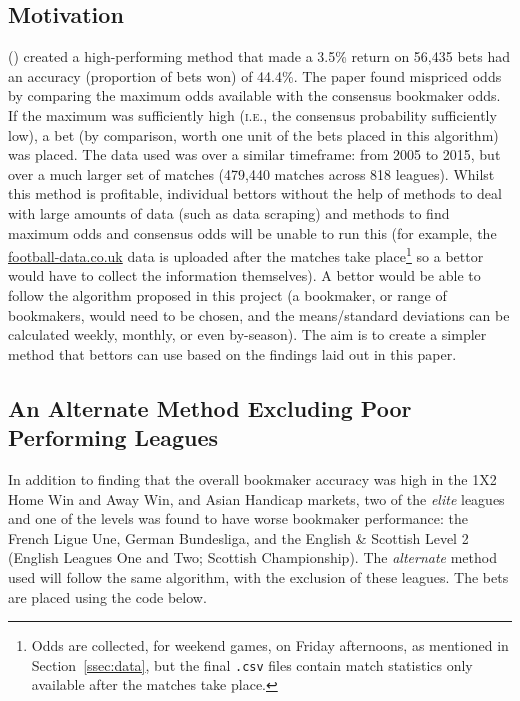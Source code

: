 \documentclass[a4paper,10pt]{report}
\begin{document}
\subsection{Motivation}\label{ssec:motivationofmethod}
\citeauthor{kaunitz17} (\citeyear{kaunitz17}) created a high-performing method that made a 3.5\% return on 56,435 bets had an accuracy (proportion of bets won) of 44.4\%. The paper found mispriced odds by comparing the maximum odds available with the consensus bookmaker odds. If the maximum was sufficiently high (\textsc{i.e.}, the consensus probability sufficiently low), a bet (by comparison, worth one unit of the bets placed in this algorithm) was placed. The data used was over a similar timeframe: from 2005 to 2015, but over a much larger set of matches (479,440 matches across 818 leagues). Whilst this method is profitable, individual bettors without the help of methods to deal with large amounts of data (such as data scraping) and methods to find maximum odds and consensus odds will be unable to run this (for example, the \url{football-data.co.uk} data is uploaded after the matches take place\footnote{Odds are collected, for weekend games, on Friday afternoons, as mentioned in Section~\ref{ssec:data}, but the final \lstinline|.csv| files contain match statistics only available after the matches take place.} so a bettor would have to collect the information themselves). A bettor would be able to follow the algorithm proposed in this project (a bookmaker, or range of bookmakers, would need to be chosen, and the means/standard deviations can be calculated weekly, monthly, or even by-season). The aim is to create a simpler method that bettors can use based on the findings laid out in this paper.

\subsection[Alternate Method]{An Alternate Method Excluding Poor Performing Leagues}\label{ssec:alternatemethod}

In addition to finding that the overall bookmaker accuracy was high in the 1X2 Home Win and Away Win, and Asian Handicap markets, two of the \textit{elite} leagues and one of the levels was found to have worse bookmaker performance: the French Ligue Une, German Bundesliga, and the English \& Scottish Level 2 (English Leagues One and Two; Scottish Championship). The \textit{alternate} method used will follow the same algorithm, with the exclusion of these leagues. The bets are placed using the code below.
\end{document}
